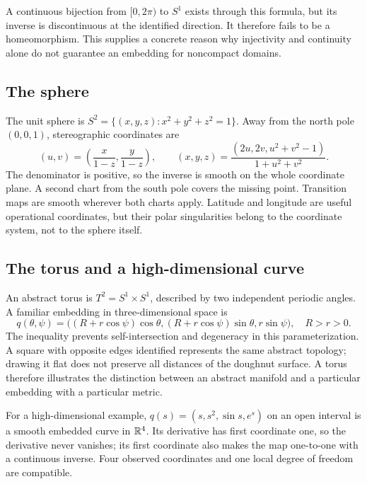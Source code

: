 A continuous bijection from $[0,2\pi)$ to $S^1$ exists through this formula, but its inverse is discontinuous at the identified direction. It therefore fails to be a homeomorphism. This supplies a concrete reason why injectivity and continuity alone do not guarantee an embedding for noncompact domains.

\subsection{The sphere}
The unit sphere is $S^2=\{(x,y,z):x^2+y^2+z^2=1\}$. Away from the north pole $(0,0,1)$, stereographic coordinates are
\begin{equation}
(u,v)=\left(\frac{x}{1-z},\frac{y}{1-z}\right),\qquad
(x,y,z)=\frac{(2u,2v,u^2+v^2-1)}{1+u^2+v^2}.
\end{equation}
The denominator is positive, so the inverse is smooth on the whole coordinate plane. A second chart from the south pole covers the missing point. Transition maps are smooth wherever both charts apply. Latitude and longitude are useful operational coordinates, but their polar singularities belong to the coordinate system, not to the sphere itself.

\subsection{The torus and a high-dimensional curve}
An abstract torus is $T^2=S^1\times S^1$, described by two independent periodic angles. A familiar embedding in three-dimensional space is
\begin{equation}\label{eq:torus-embedding}
q(\theta,\psi)=\big((R+r\cos\psi)\cos\theta,
(R+r\cos\psi)\sin\theta,r\sin\psi\big),\quad R>r>0.
\end{equation}
The inequality prevents self-intersection and degeneracy in this parameterization. A square with opposite edges identified represents the same abstract topology; drawing it flat does not preserve all distances of the doughnut surface. A torus therefore illustrates the distinction between an abstract manifold and a particular embedding with a particular metric.

For a high-dimensional example, $q(s)=(s,s^2,\sin s,e^s)$ on an open interval is a smooth embedded curve in $\mathbb{R}^4$. Its derivative has first coordinate one, so the derivative never vanishes; its first coordinate also makes the map one-to-one with a continuous inverse. Four observed coordinates and one local degree of freedom are compatible.

